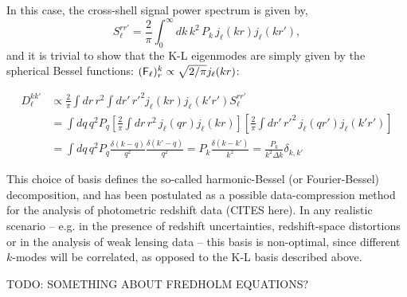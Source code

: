 \documentclass[twocolumn,amsfont,amssymb,amsmath, showpacs,balancelastpage, nofootinbib]{revtex4-1}
\begin{document}
    In this case, the cross-shell signal power spectrum is given by,
    \begin{equation}
      S_\ell^{rr'}=\frac{2}{\pi}\int_0^\infty dk\,k^2\,P_k\,j_\ell(kr)j_\ell(kr'),
    \end{equation}
    and it is trivial to show that the K-L eigenmodes are simply given by the spherical Bessel functions: $({\sf F}_\ell)^k_r\propto \sqrt{2/\pi}j_\ell(kr)$:
    \begin{widetext}
    \begin{align}
      D_\ell^{kk'}&\propto\frac{2}{\pi}\int dr\,r^2\int dr'\,r'^2 j_\ell(kr)j_\ell(k'r') S_\ell^{rr'}\\
      &=\int dq\,q^2P_q\left[\frac{2}{\pi}\int dr\,r^2\,j_\ell(qr)j_\ell(kr)\right]\left[\frac{2}{\pi}\int dr'\,r'^2\,j_\ell(qr')j_\ell(k'r')\right]\\
      &=\int dq\,q^2P_q\frac{\delta(k-q)}{q^2}\frac{\delta(k'-q)}{q^2}=P_k\frac{\delta(k-k')}{k^2}=\frac{P_k}{k^2\Delta k}\delta_{k,k'}
    \end{align}
    \end{widetext}
   
    This choice of basis defines the so-called harmonic-Bessel (or Fourier-Bessel) decomposition, and has been postulated as a possible data-compression method for the analysis of photometric redshift data (CITES here). In any realistic scenario -- e.g. in the presence of redshift uncertainties, redshift-space distortions or in the analysis of weak lensing data -- this basis is non-optimal, since different $k$-modes will be correlated, as opposed to the K-L basis described above.
    
    TODO: SOMETHING ABOUT FREDHOLM EQUATIONS?
\end{document}
